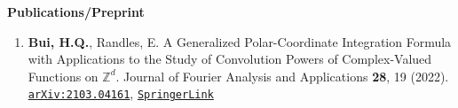 \documentclass[10pt]{article}
\begin{document}
\noindent \large{\textbf{{Publications/Preprint}}}	\normalsize	\vspace{-5pt}
\begin{enumerate}
	\setlength\itemsep{-4pt}
	\item \textbf{Bui, H.Q.}, Randles, E. {A Generalized Polar-Coordinate Integration Formula with Applications to the Study of Convolution Powers of Complex-Valued Functions on $\mathbb{Z}^d$}. Journal of  Fourier Analysis and Applications \textbf{28}, 19 (2022). \href{https://arxiv.org/abs/2103.04161}{\texttt{arXiv:2103.04161}}, \href{https://doi.org/10.1007/s00041-022-09905-x}{\texttt{SpringerLink}}
	
	
\end{enumerate}
				
\end{document}

